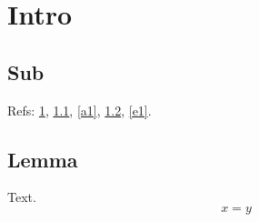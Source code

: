 \documentclass{IEEEtran}
\begin{document}
\section{Intro}\label{s1}
\subsection{Sub}\label{s11}
Refs: \ref{s1}, \ref{s11}, \ref{a1}, \ref{a11}, \ref{e1}.
\appendix[Proof]
\label{a1}
\subsection{Lemma}\label{a11}
Text.
\begin{equation}x=y\label{e1}\end{equation}
\end{document}
